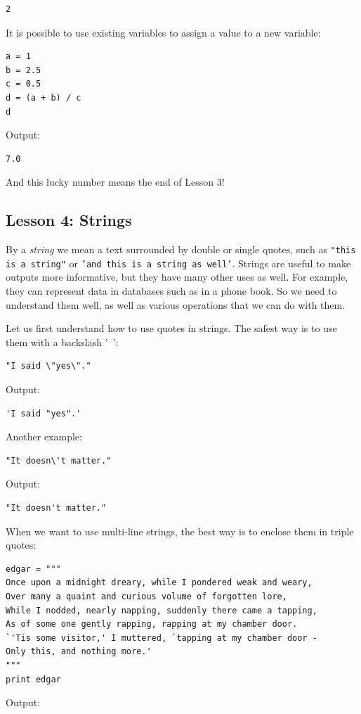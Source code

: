 \documentclass[article,A4,12pt]{llncs}
\begin{document}
\begin{verbatim}
2
\end{verbatim}
It is possible to use existing variables to assign a value to a new variable:

\begin{verbatim}
a = 1
b = 2.5
c = 0.5
d = (a + b) / c
d
\end{verbatim}
Output:

\begin{verbatim}
7.0
\end{verbatim}
And this lucky number means the end of Lesson 3!

\subsection{Lesson 4: Strings}

By a {\em string} we mean a text surrounded by double or single quotes, such as 
{\tt "this is a string"} or {\tt 'and this is a string as well'}.
Strings are useful to make outputs more informative, but 
they have many other uses as well. For example, they can represent data 
in databases such as in a phone book. So we need to understand them well,
as well as various operations that we can do with them.

Let us first understand how to use quotes in strings. The safest way is to use 
them with a backslash '{\tt \ }':

\begin{verbatim}
"I said \"yes\"."
\end{verbatim}
Output:

\begin{verbatim}
'I said "yes".'
\end{verbatim}
Another example:

\begin{verbatim}
"It doesn\'t matter."
\end{verbatim}
Output:

\begin{verbatim}
"It doesn't matter."
\end{verbatim}
When we want to use multi-line strings, the best way is to enclose them 
in triple quotes:

\begin{verbatim}
edgar = """
Once upon a midnight dreary, while I pondered weak and weary,
Over many a quaint and curious volume of forgotten lore,
While I nodded, nearly napping, suddenly there came a tapping,
As of some one gently rapping, rapping at my chamber door.
`'Tis some visitor,' I muttered, `tapping at my chamber door -
Only this, and nothing more.'
"""
print edgar
\end{verbatim}
Output:
\end{document}
